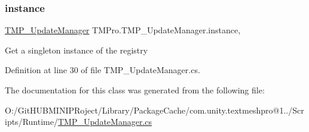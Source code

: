 \subsubsection{\texorpdfstring{instance}{instance}}
{\footnotesize\ttfamily \mbox{\hyperlink{class_t_m_pro_1_1_t_m_p___update_manager}{T\+M\+P\+\_\+\+Update\+Manager}} T\+M\+Pro.\+T\+M\+P\+\_\+\+Update\+Manager.\+instance\hspace{0.3cm}{\ttfamily [static]}, {\ttfamily [get]}}



Get a singleton instance of the registry 



Definition at line 30 of file T\+M\+P\+\_\+\+Update\+Manager.\+cs.



The documentation for this class was generated from the following file\+:\begin{DoxyCompactItemize}
\item 
O\+:/\+Git\+H\+U\+B\+M\+I\+N\+I\+P\+Roject/\+Library/\+Package\+Cache/com.\+unity.\+textmeshpro@1../\+Scripts/\+Runtime/\mbox{\hyperlink{_t_m_p___update_manager_8cs}{T\+M\+P\+\_\+\+Update\+Manager.\+cs}}\end{DoxyCompactItemize}
